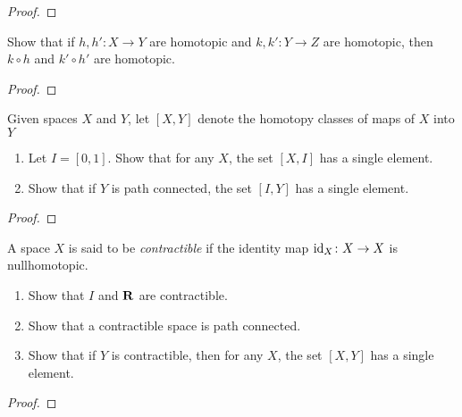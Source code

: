 \begin{proof}
\end{proof}
\newpage
\begin{problem}[Munkres \S52, Ex.\,1]
Show that if $h,h'\colon X\to Y$ are homotopic and $k,k'\colon
Y\to Z$ are homotopic, then $k\circ h$ and $k'\circ h'$ are
homotopic.
\end{problem}
\begin{proof}
\end{proof}
\newpage
\begin{problem}[Munkres \S52, Ex.\,2]
Given spaces $X$ and $Y$, let $[X,Y]$ denote the homotopy classes
of maps of $X$ into $Y$
\begin{enumerate}[label=(\alph*)]
\item Let $I=[0,1]$. Show that for any $X$, the set $[X,I]$ has a
  single element.
\item Show that if $Y$ is path connected, the set $[I,Y]$ has a
  single element.
\end{enumerate}
\end{problem}
\begin{proof}
\end{proof}
\newpage
\begin{problem}[Munkres \S52, Ex.\,3(a,b,c,)]
A space $X$ is said to be \emph{contractible} if the identity map
$\operatorname{id}_X\colon X\to X$ is nullhomotopic.
\begin{enumerate}[label=(\alph*)]
\item Show that $I$ and $\mathbf{R}$ are contractible.
\item Show that a contractible space is path connected.
\item Show that if $Y$ is contractible, then for any $X$, the set
  $[X,Y]$ has a single element.
\end{enumerate}
\end{problem}
\begin{proof}
\end{proof}

